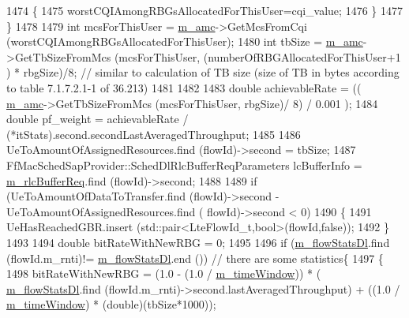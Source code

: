 \begin{DoxyCode}
1474                     \{
1475                       worstCQIAmongRBGsAllocatedForThisUser=cqi\_value;
1476                     \}
1477                 \}
1478 
1479               \textcolor{keywordtype}{int} mcsForThisUser = \hyperlink{classns3_1_1CqaFfMacScheduler_aa32ec6c7683816a4afdb922f73c0fdc6}{m\_amc}->GetMcsFromCqi (worstCQIAmongRBGsAllocatedForThisUser);
1480               \textcolor{keywordtype}{int} tbSize = \hyperlink{classns3_1_1CqaFfMacScheduler_aa32ec6c7683816a4afdb922f73c0fdc6}{m\_amc}->GetTbSizeFromMcs (mcsForThisUser, (numberOfRBGAllocatedForThisUser+1
      ) * rbgSize)/8;                           \textcolor{comment}{// similar to calculation of TB size (size of TB in bytes
       according to table 7.1.7.2.1-1 of 36.213)}
1481 
1482 
1483               \textcolor{keywordtype}{double} achievableRate = (( \hyperlink{classns3_1_1CqaFfMacScheduler_aa32ec6c7683816a4afdb922f73c0fdc6}{m\_amc}->GetTbSizeFromMcs (mcsForThisUser, rbgSize)/ 8) / 0.001
      );
1484               \textcolor{keywordtype}{double} pf\_weight = achievableRate / (*itStats).second.secondLastAveragedThroughput;
1485 
1486               UeToAmountOfAssignedResources.find (flowId)->second = tbSize;
1487               FfMacSchedSapProvider::SchedDlRlcBufferReqParameters lcBufferInfo = 
      \hyperlink{classns3_1_1CqaFfMacScheduler_ae9f6c7fc32e6dd08573470c70d827610}{m\_rlcBufferReq}.find (flowId)->second;
1488 
1489               \textcolor{keywordflow}{if} (UeToAmountOfDataToTransfer.find (flowId)->second - UeToAmountOfAssignedResources.find (
      flowId)->second < 0)
1490                 \{
1491                   UeHasReachedGBR.insert (std::pair<LteFlowId\_t,bool>(flowId,\textcolor{keyword}{false}));
1492                 \}
1493 
1494               \textcolor{keywordtype}{double} bitRateWithNewRBG = 0;
1495 
1496               \textcolor{keywordflow}{if} (\hyperlink{classns3_1_1CqaFfMacScheduler_a1cf6c47e55cbcfb9c28b17c242bde972}{m\_flowStatsDl}.find (flowId.m\_rnti)!= 
      \hyperlink{classns3_1_1CqaFfMacScheduler_a1cf6c47e55cbcfb9c28b17c242bde972}{m\_flowStatsDl}.end ())                         \textcolor{comment}{// there are some statistics\{}
1497                 \{
1498                   bitRateWithNewRBG = (1.0 - (1.0 / \hyperlink{classns3_1_1CqaFfMacScheduler_a2e6951b5a91130305fe3d835bca0f33d}{m\_timeWindow})) * (
      \hyperlink{classns3_1_1CqaFfMacScheduler_a1cf6c47e55cbcfb9c28b17c242bde972}{m\_flowStatsDl}.find (flowId.m\_rnti)->second.lastAveragedThroughput) + ((1.0 / 
      \hyperlink{classns3_1_1CqaFfMacScheduler_a2e6951b5a91130305fe3d835bca0f33d}{m\_timeWindow}) * (double)(tbSize*1000));

\end{DoxyCode}
